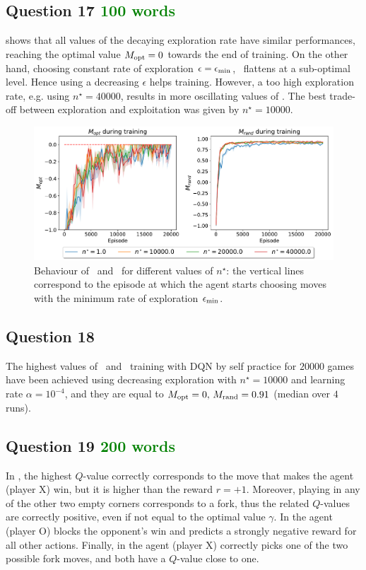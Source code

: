 \documentclass[10pt]{IEEEtran}
\begin{document}
\subsection*{Question 17  \textcolor{Green}{100 words}}
 shows that all values of the decaying exploration rate have similar performances, reaching the optimal value $M_{\text{opt}} = 0$ towards the end of training. On the other hand, choosing constant rate of exploration $\epsilon = \epsilon_{\text{min}}$, \mrand \ flattens at a sub-optimal level. Hence using a decreasing $\epsilon$ helps training. However, a too high exploration rate, e.g. using $n^{\star} = 40000$, results in more oscillating values of \mopt. The best trade-off between exploration and exploitation was given by $n^{\star} = 10000$.    
\begin{figure}[h]
    \centering
    \includegraphics[width = \linewidth]{code/figures/performance_n_star_dqn_self.pdf}
    \caption{Behaviour of \mopt\ and \mrand\ for different values of $n^{\star}$: the vertical lines correspond to the episode at which the agent starts choosing moves with the minimum rate of exploration $\epsilon_{\text{min}}$.}
    \label{plot_question17}
\end{figure}

\subsection*{Question 18}
The highest values of \mopt\  and \mrand\  training with DQN by self practice for $20000$ games have been achieved using decreasing exploration with $n^{\star} = 10000$ and learning rate $\alpha = 10^{-4}$, and they are equal to $M_{\text{opt}} = 0, \, M_{\text{rand}} = 0.91$ (median over $4$ runs).

\subsection*{Question 19  \textcolor{Green}{200 words}}
In , the highest $Q$-value correctly corresponds to the move that makes the agent (player X) win, but it is higher than the reward $r = +1$. Moreover, playing in any of the other two empty corners corresponds to a fork, thus the related $Q$-values are correctly positive, even if not equal to the optimal value $\gamma$. In  the agent (player O) blocks the opponent's win and predicts a strongly negative reward for all other actions. Finally, in  the agent (player X) correctly picks one of the two possible fork moves, and both have a $Q$-value close to one.
\end{document}
